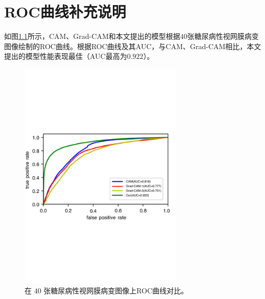\chapter{ROC曲线补充说明}\label{chapter:append1}
如图\ref{fig:roc_cam_grad_cam_our_diabetic_retinopathy}所示，CAM、Grad-CAM和本文提出的模型根据$40$张糖尿病性视网膜病变图像绘制的ROC曲线。根据ROC曲线及其AUC，与CAM、Grad-CAM相比，本文提出的模型性能表现最佳（AUC最高为$0.922$）。
\begin{figure}[H]
	\centering
	\includegraphics[width=0.7\textwidth]{figure/ROC_cam_grad_cam_our_diabetic_retinopathy}
	\caption[在$40$张糖尿病性视网膜病变图像上ROC曲线对比]{在 $40$ 张糖尿病性视网膜病变图像上ROC曲线对比。}
	\label{fig:roc_cam_grad_cam_our_diabetic_retinopathy}
\end{figure}

